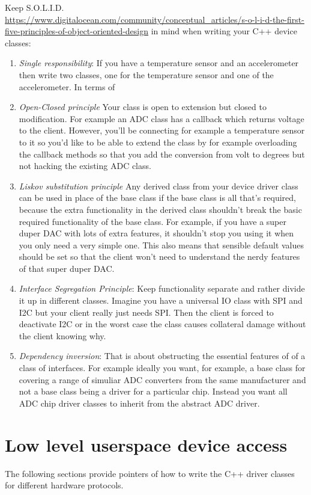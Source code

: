 \documentclass[12pt]{report}
\begin{document}
Keep S.O.L.I.D.
\url{https://www.digitalocean.com/community/conceptual_articles/s-o-l-i-d-the-first-five-principles-of-object-oriented-design}
in mind when writing your C++ device classes:
\begin{enumerate}
\item \textsl{Single responsibility}: If you have a temperature
sensor and an accelerometer then write two classes, one for the
temperature sensor and one of the accelerometer. In terms of
\item \textsl{Open-Closed principle} Your class is open to extension but
  closed to modification. For example an ADC class
  has a callback which returns voltage to the client. However,
  you'll be connecting for example a temperature sensor to
  it so you'd like to be able to extend the class by for example
  overloading the callback methods so that you add the conversion
  from volt to degrees but not hacking the existing ADC class.
\item \textsl{Liskov substitution principle} Any derived class from
  your device driver class can be used in place of the base class if
  the base class is all that's required, because the extra
  functionality in the derived class shouldn't break the basic
  required functionality of the base class. For example, if you have a
  super duper DAC with lots of extra features, it shouldn't stop you
  using it when you only need a very simple one. This also means
  that sensible default values should be set so that the client
  won't need to understand the nerdy features of that super duper DAC.
\item \textsl{Interface Segregation Principle}:
  Keep functionality separate and rather divide it up in different
  classes. Imagine you have a universal IO class with SPI and I2C
  but your client really just needs SPI. Then the client is forced
  to deactivate I2C or in the worst case the class causes collateral
  damage without the client knowing why.
\item \textsl{Dependency inversion}: That is about obstructing the
  essential features of of a class of interfaces. For example ideally
  you want, for example, a base class for covering a range of simuliar
  ADC converters from the same manufacturer and not a base class being
  a driver for a particular chip. Instead you want all ADC chip driver
  classes to inherit from the abstract ADC driver.
\end{enumerate}

\section{Low level userspace device access}
The following sections provide pointers of how to write
the C++ driver classes for different hardware protocols.
\end{document}
